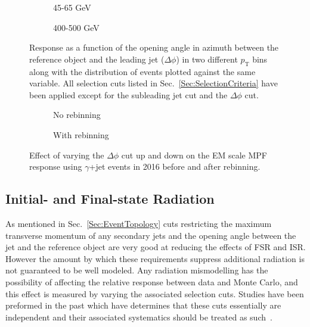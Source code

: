 \begin{figure}[!ht]
\centering
\begin{subfigure}{.5\textwidth}
\centering
{}
\caption{45-65 GeV}
\end{subfigure}%
\begin{subfigure}{.5\textwidth}
\centering
{}
\caption{400-500 GeV}
\end{subfigure}
\caption[Response as a function of $\Delta\phi$ for two $p_{\mathrm{T}}$ bins]
{\small Response as a function of the opening angle in azimuth between the reference object and the leading jet ($\Delta\phi$) in two different $p_{\mathrm T}$ bins along with the distribution of events plotted against the same variable.  All selection cuts listed in Sec.~\ref{Sec:SelectionCriteria} have been applied except for the subleading jet cut and the $\Delta\phi$ cut.  }
\label{Fig:RespVsdPhiGJetEM2016}
\end{figure}

\begin{figure}[!ht]
\centering
\begin{subfigure}{.5\textwidth}
\centering
{}
\caption{No rebinning}
\end{subfigure}%
\begin{subfigure}{.5\textwidth}  \centering
{}
\caption{With rebinning}
\end{subfigure}
\caption{Effect of varying the $\Delta\phi$ cut up and down on the EM scale MPF response using $\gamma$+jet events in 2016 before and after rebinning. }
\label{Fig:dPhiGJetEM2016}
\end{figure}

\subsection{Initial- and Final-state Radiation}
As mentioned in Sec.~\ref{Sec:EventTopology} cuts restricting the maximum transverse momentum of any secondary jets and the opening angle between the jet and the reference object are very good at reducing the effects of FSR and ISR.
However the amount by which these requirements suppress additional radiation is not guaranteed to be well modeled.
Any radiation mismodelling has the possibility of affecting the relative response between data and Monte Carlo, and this effect is measured by varying the associated selection cuts.  
Studies have been preformed in the past which have determines that these cuts essentially are independent and their associated systematics should be treated as such~\cite{ATLAS-CONF-2011-031}.  

